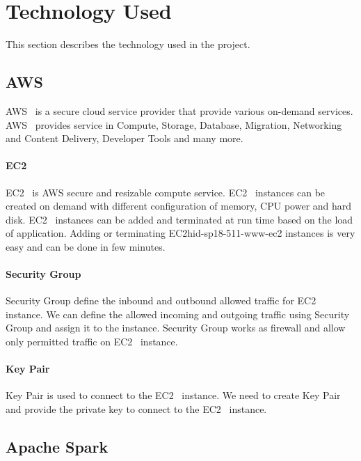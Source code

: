 \section{Technology Used}
This section describes the technology used in the project.

\subsection{AWS}

AWS~\cite{hid-sp18-511-www-aws} is a secure cloud service provider
that provide various on-demand services.
AWS~\cite{hid-sp18-511-www-aws} provides service in Compute, Storage,
Database, Migration, Networking and Content Delivery, Developer Tools
and many more.

\paragraph{EC2}

EC2~\cite{hid-sp18-511-www-ec2} is AWS secure and resizable compute
service. EC2~\cite{hid-sp18-511-www-ec2} instances can be created on
demand with different configuration of memory, CPU power and hard
disk. EC2~\cite{hid-sp18-511-www-ec2} instances can be added and
terminated at run time based on the load of application. Adding or
terminating EC2{hid-sp18-511-www-ec2} instances is very easy and can
be done in few minutes.

\paragraph{Security Group}

Security Group define the inbound and outbound allowed traffic for
EC2~\cite{hid-sp18-511-www-ec2} instance.  We can define the allowed
incoming and outgoing traffic using Security Group and assign it to
the instance.  Security Group works as firewall and allow only
permitted traffic on EC2~\cite{hid-sp18-511-www-ec2} instance.

\paragraph{Key Pair}

Key Pair is used to connect to the EC2~\cite{hid-sp18-511-www-ec2}
instance. We need to create Key Pair and provide the private key to
connect to the EC2~\cite{hid-sp18-511-www-ec2} instance.

\subsection{Apache Spark}

